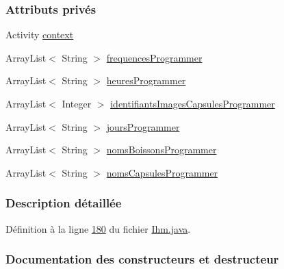 \subsubsection*{Attributs privés}
\begin{DoxyCompactItemize}
\item 
Activity \hyperlink{classcom_1_1example_1_1ekawa_1_1_ihm_1_1_adaptateur_programmer_aa2573f7d985ef662075730cb36a80f8a}{context}
\item 
Array\+List$<$ String $>$ \hyperlink{classcom_1_1example_1_1ekawa_1_1_ihm_1_1_adaptateur_programmer_a877b83e1a28ac8f704052df39aad695e}{frequences\+Programmer}
\item 
Array\+List$<$ String $>$ \hyperlink{classcom_1_1example_1_1ekawa_1_1_ihm_1_1_adaptateur_programmer_a114578f4eb2a34e7d3a258635c2ad9f1}{heures\+Programmer}
\item 
Array\+List$<$ Integer $>$ \hyperlink{classcom_1_1example_1_1ekawa_1_1_ihm_1_1_adaptateur_programmer_a468b21b654bd1c5cc663e1abf34c62ba}{identifiants\+Images\+Capsules\+Programmer}
\item 
Array\+List$<$ String $>$ \hyperlink{classcom_1_1example_1_1ekawa_1_1_ihm_1_1_adaptateur_programmer_a935bc1f05da276a491141ff78b66dad6}{jours\+Programmer}
\item 
Array\+List$<$ String $>$ \hyperlink{classcom_1_1example_1_1ekawa_1_1_ihm_1_1_adaptateur_programmer_a6cf686ef8f8c82dee10e609c7544a8e6}{noms\+Boissons\+Programmer}
\item 
Array\+List$<$ String $>$ \hyperlink{classcom_1_1example_1_1ekawa_1_1_ihm_1_1_adaptateur_programmer_ae079ecc919f92004afb238e01bb53928}{noms\+Capsules\+Programmer}
\end{DoxyCompactItemize}


\subsubsection{Description détaillée}


Définition à la ligne \hyperlink{_ihm_8java_source_l00180}{180} du fichier \hyperlink{_ihm_8java_source}{Ihm.\+java}.



\subsubsection{Documentation des constructeurs et destructeur}
\mbox{\label{classcom_1_1example_1_1ekawa_1_1_ihm_1_1_adaptateur_programmer_a8a6bb79a26e790339065f37777890a34}} 
